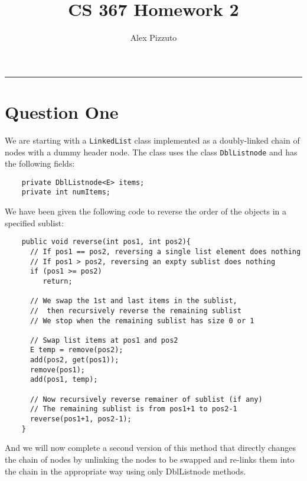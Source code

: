 \documentclass[11pt,letterpaper]{article}
\author{Alex Pizzuto}
\title{CS 367 Homework 2}
\begin{document}
\date{}
\maketitle
\hrule

\section{Question One}
We are starting with a \texttt{LinkedList} class implemented as a doubly-linked chain of nodes with a dummy header node. The class uses the class \texttt{DblListnode} and has the following fields:
\begin{lstlisting}
	private DblListnode<E> items;
	private int numItems;
\end{lstlisting}
We have been given the following code to reverse the order of the objects in a specified sublist:
\begin{lstlisting}
	public void reverse(int pos1, int pos2){
	  // If pos1 == pos2, reversing a single list element does nothing
	  // If pos1 > pos2, reversing an expty sublist does nothing
	  if (pos1 >= pos2)
	     return;
									
	  // We swap the 1st and last items in the sublist,
	  //  then recursively reverse the remaining sublist
	  // We stop when the remaining sublist has size 0 or 1

	  // Swap list items at pos1 and pos2
	  E temp = remove(pos2);
	  add(pos2, get(pos1));
	  remove(pos1);
	  add(pos1, temp);

	  // Now recursively reverse remainer of sublist (if any)
	  // The remaining sublist is from pos1+1 to pos2-1
	  reverse(pos1+1, pos2-1);
	}
\end{lstlisting}
And we will now complete a second version of this method that directly changes the chain of nodes by unlinking the nodes to be swapped and re-links them into the chain in the appropriate way using only DblListnode methods.
\end{document}
